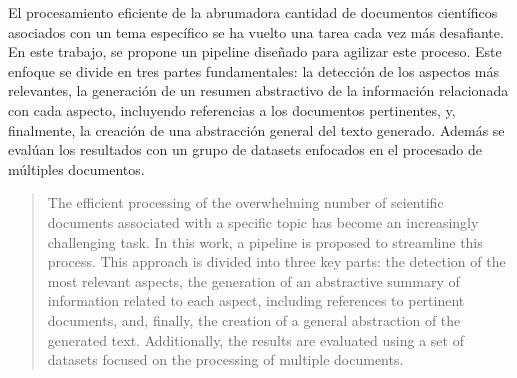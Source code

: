 \begin{resumen}
	El procesamiento eficiente de la abrumadora cantidad de documentos científicos asociados con un tema específico se ha vuelto una tarea cada vez más desafiante. En este trabajo, se propone un pipeline diseñado para agilizar este proceso. Este enfoque se divide en tres partes fundamentales: la detección de los aspectos más relevantes, la generación de un resumen abstractivo de la información relacionada con cada aspecto, incluyendo referencias a los documentos pertinentes, y, finalmente, la creación de una abstracción general del texto generado. Además se evalúan los resultados con un grupo de datasets enfocados en el procesado de múltiples documentos. 
\end{resumen}

\begin{abstract}
	The efficient processing of the overwhelming number of scientific documents associated with a specific topic has become an increasingly challenging task. In this work, a pipeline is proposed to streamline this process. This approach is divided into three key parts: the detection of the most relevant aspects, the generation of an abstractive summary of information related to each aspect, including references to pertinent documents, and, finally, the creation of a general abstraction of the generated text. Additionally, the results are evaluated using a set of datasets focused on the processing of multiple documents.
\end{abstract}